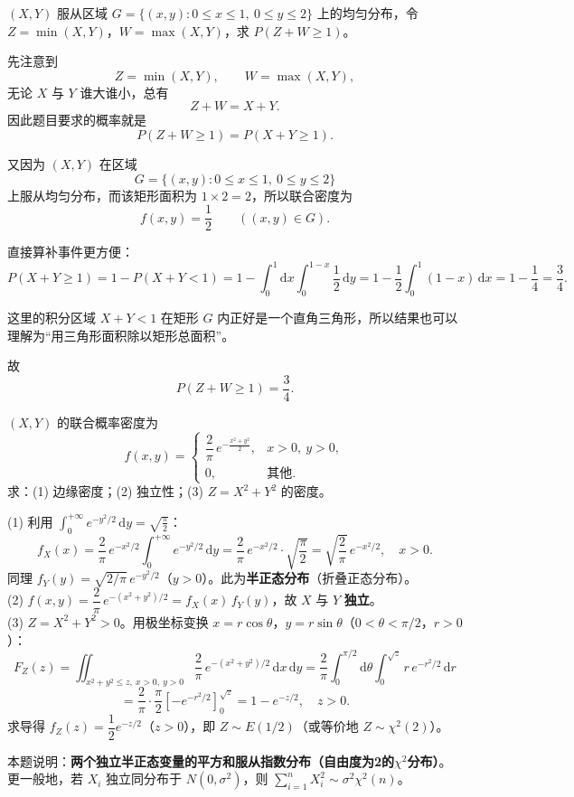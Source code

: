﻿\documentclass[lang=cn,11pt]{elegantbook}
\begin{document}
\begin{exercise}[min+max=X+Y] \label{exer:3-c10b}
$(X,Y)$ 服从区域 $G=\{(x,y):0\leqslant x\leqslant 1,\ 0\leqslant y\leqslant 2\}$ 上的均匀分布，令 $Z=\min(X,Y)$，$W=\max(X,Y)$，求 $P(Z+W \geqslant 1)$。
\end{exercise}
\begin{solution}
先注意到
\[
Z=\min(X,Y),\qquad W=\max(X,Y),
\]
无论 \(X\) 与 \(Y\) 谁大谁小，总有
\[
Z+W=X+Y.
\]
因此题目要求的概率就是
\[
P(Z+W\geqslant 1)=P(X+Y\geqslant 1).
\]

又因为 \((X,Y)\) 在区域
\[
G=\{(x,y):0\le x\le 1,\ 0\le y\le 2\}
\]
上服从均匀分布，而该矩形面积为 \(1\times 2=2\)，所以联合密度为
\[
f(x,y)=\frac12\qquad ((x,y)\in G).
\]

直接算补事件更方便：
\[
P(X+Y \geqslant 1) = 1 - P(X+Y < 1) = 1 - \int_0^1\mathrm{d}x\int_0^{1-x}\frac{1}{2}\,\mathrm{d}y = 1 - \frac{1}{2}\int_0^1(1-x)\,\mathrm{d}x = 1-\frac{1}{4} = \frac{3}{4}.
\]

这里的积分区域 \(X+Y<1\) 在矩形 \(G\) 内正好是一个直角三角形，所以结果也可以理解为“用三角形面积除以矩形总面积”。

故
\[
P(Z+W\geqslant 1)=\frac34.
\]
\end{solution}


\begin{exercise}[半正态联合密度与极坐标变换] \label{exer:3-c13b}
$(X,Y)$ 的联合概率密度为
\[
f(x,y) = \begin{cases} \dfrac{2}{\pi}\,e^{-\frac{x^2+y^2}{2}}, & x>0,\ y>0, \\ 0, & \text{其他}. \end{cases}
\]
求：(1) 边缘密度；(2) 独立性；(3) $Z=X^2+Y^2$ 的密度。
\end{exercise}
\begin{solution}
(1) 利用 $\displaystyle\int_0^{+\infty}e^{-y^2/2}\,\mathrm{d}y = \sqrt{\frac{\pi}{2}}$：
\[
f_X(x) = \frac{2}{\pi}\,e^{-x^2/2}\int_0^{+\infty}e^{-y^2/2}\,\mathrm{d}y = \frac{2}{\pi}\,e^{-x^2/2}\cdot\sqrt{\frac{\pi}{2}} = \sqrt{\frac{2}{\pi}}\,e^{-x^2/2},\quad x>0.
\]
同理 $f_Y(y) = \sqrt{2/\pi}\,e^{-y^2/2}$（$y>0$）。此为\textbf{半正态分布}（折叠正态分布）。\\
(2) $f(x,y) = \dfrac{2}{\pi}\,e^{-(x^2+y^2)/2} = f_X(x)\,f_Y(y)$，故 $X$ 与 $Y$ \textbf{独立}。\\
(3) $Z=X^2+Y^2 > 0$。用极坐标变换 $x=r\cos\theta$，$y=r\sin\theta$（$0<\theta<\pi/2$，$r>0$）：
\[
F_Z(z) = \iint_{x^2+y^2 \leqslant z,\ x>0,\ y>0}\frac{2}{\pi}\,e^{-(x^2+y^2)/2}\,\mathrm{d}x\,\mathrm{d}y = \frac{2}{\pi}\int_0^{\pi/2}\mathrm{d}\theta\int_0^{\sqrt{z}}r\,e^{-r^2/2}\,\mathrm{d}r
\]
\[
= \frac{2}{\pi}\cdot\frac{\pi}{2}\left[-e^{-r^2/2}\right]_0^{\sqrt{z}} = 1-e^{-z/2},\quad z>0.
\]
求导得 $f_Z(z) = \dfrac{1}{2}e^{-z/2}$（$z>0$），即 $Z \sim E(1/2)$（或等价地 $Z\sim\chi^2(2)$）。
\begin{note}
本题说明：\textbf{两个独立半正态变量的平方和服从指数分布（自由度为2的$\chi^2$分布）}。更一般地，若 $X_i$ 独立同分布于 $N(0,\sigma^2)$，则 $\sum_{i=1}^n X_i^2 \sim \sigma^2\chi^2(n)$。
\end{note}
\end{solution}
\end{document}
